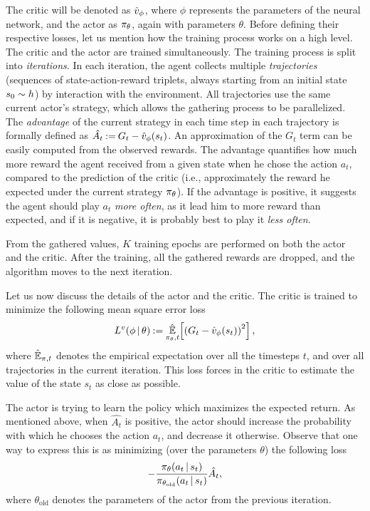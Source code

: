 The critic will be denoted as $ \critic $, where $ \phi $ represents the parameters of the neural network, and the actor as $ \actor $, again with parameters $ \theta $.
Before defining their respective losses, let us mention how the training process works on a high level.
The critic and the actor are trained simultaneously.
The training process is split into \emph{iterations}.
In each iteration, the agent collects multiple \emph{trajectories} (sequences of state-action-reward triplets, always starting from an initial state $ s_0 \sim \initial $) by interaction with the environment.
All trajectories use the same current actor's strategy, which allows the gathering process to be parallelized.
The \emph{advantage} of the current strategy in each time step in each trajectory is formally defined as $ \hat {A_t} \deq G_t - \fce\critic {s_t} $.
An approximation of the $ G_t $ term can be easily computed from the observed rewards.
The advantage quantifies how much more reward the agent received from a given state when he chose the action $ a_t $, compared to the prediction of the critic (i.e., approximately the reward he expected under the current strategy $ \actor $).
If the advantage is positive, it suggests the agent should play $ a_t $ \emph{more often}, as it lead him to more reward than expected, and if it is negative, it is probably best to play it \emph{less often}.

From the gathered values, $ K $ training epochs are performed on both the actor and the critic.
After the training, all the gathered rewards are dropped, and the algorithm moves to the next iteration.

Let us now discuss the details of the actor and the critic.
The critic is trained to minimize the following mean square error loss \[
	\losscritic \deq \fceb {\EE_{\actor,t}}{\left( \return_t - \fce{\critic}{s_t} \right)^2},
\]
where $ \EE_{\pi,t} $ denotes the empirical expectation over all the timesteps $ t $, and over all trajectories in the current iteration.
This loss forces in the critic to estimate the value of the state $ s_t $ as close as possible.

The actor is trying to learn the policy which maximizes the expected return.
As mentioned above, when $ \hat{A_t} $ is positive, the actor should increase the probability with which he chooses the action $ a_t $, and decrease it otherwise.
Observe that one way to express this is as minimizing (over the parameters $ \theta $) the following loss \[
	-\frac{\fce{\actor}{a_t \suchthat s_t}}{\fce{\actor[\theta_{\text{old}}]}{a_t \suchthat s_t}} \hat{A_t},
\]
where $ \theta_{\text{old}} $ denotes the parameters of the actor from the previous iteration.

